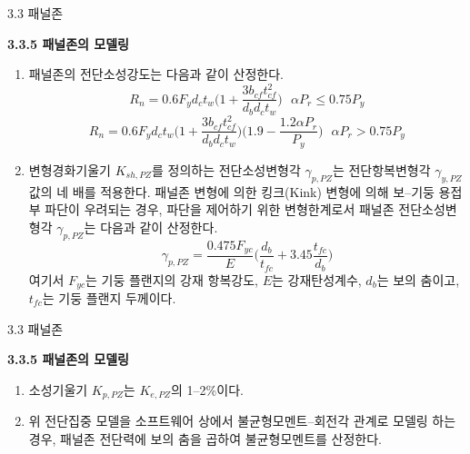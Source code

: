 	
	\begin{frame}{3.3 패널존}

	\textbf{3.3.5 패널존의 모델링}
	
	\begin{enumerate}
		\item[(3)] 패널존의 전단소성강도는 다음과 같이 산정한다. 
		\[R_n = 0.6F_yd_ct_w\Big(1 + \frac{3b_{cf}t_{cf}^2}{d_bd_ct_w}\Big)~~~\alpha P_r \leq 0.75 P_y\]		
		\[R_n = 0.6F_yd_ct_w\Big(1 + \frac{3b_{cf}t_{cf}^2}{d_bd_ct_w}\Big)\Big(1.9-\frac{1.2\alpha P_r}{P_y}\Big)~~~\alpha P_r > 0.75 P_y\]		
		\item[(4)] 변형경화기울기 $K_{sh,PZ}$를 정의하는 전단소성변형각 $\gamma_{p,PZ}$는 전단항복변형각 $\gamma_{y,PZ}$ 값의 네 배를 적용한다. 패널존 변형에 의한 킹크(Kink) 변형에 의해 보--기둥 용접부 파단이 우려되는 경우, 파단을 제어하기 위한 변형한계로서 패널존 전단소성변형각 $\gamma_{p,PZ}$는 다음과 같이 산정한다. 
		\[\gamma_{p,PZ} = \frac{0.475F_{yc}}{E}\Big(\frac{d_b}{t_{fc}}+3.45\frac{t_{fc}}{d_b}\Big)\]
		\noindent 여기서 $F_{yc}$는 기둥 플랜지의 강재 항복강도, $E$는 강재탄성계수, $d_b$는 보의 춤이고, $t_{fc}$는 기둥 플랜지 두께이다.  
	\end{enumerate}
	\end{frame}
	
	
	

	\begin{frame}{3.3 패널존}

	\textbf{3.3.5 패널존의 모델링}
	
	\begin{enumerate}
		\item[(5)] 소성기울기 $K_{p,PZ}$는 $K_{e,PZ}$의 1--2\%이다. 
		\item[(6)] 위 전단집중 모델을 소프트웨어 상에서 불균형모멘트--회전각 관계로 모델링 하는 경우, 패널존 전단력에 보의 춤을 곱하여 불균형모멘트를 산정한다. 
	\end{enumerate}
	\end{frame}